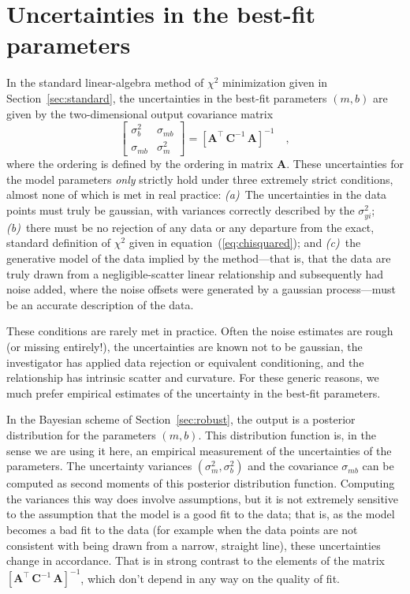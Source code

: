 \documentclass[12pt,twoside]{article}
\newcommand{\sectionname}{Section}
\newcommand{\equationname}{equation}
\newcommand{\mmatrix}[1]{\boldsymbol{#1}}
\newcommand{\inverse}[1]{{#1}^{-1}}
\newcommand{\transpose}[1]{{#1}^{\scriptscriptstyle \top}}
\newcommand{\mA}{\mmatrix{A}}
\newcommand{\mAT}{\transpose{\mA}}
\newcommand{\mC}{\mmatrix{C}}
\newcommand{\mCinv}{\inverse{\mC}}
\begin{document}
\section{Uncertainties in the best-fit parameters}\label{sec:uncertainty}

In the standard linear-algebra method of $\chi^2$ minimization given
in \sectionname~\ref{sec:standard}, the uncertainties in the best-fit
parameters $(m,b)$ are given by the two-dimensional output covariance
matrix
\begin{equation}
\left[\begin{array}{cc}
\sigma_{b}^2 & \sigma_{mb} \\
\sigma_{mb} & \sigma_{m}^2
\end{array}\right] = \inverse{\left[\mAT\,\mCinv\,\mA\right]} \quad ,
\end{equation}
where the ordering is defined by the ordering in matrix $\mA$.  These
uncertainties for the model parameters \emph{only} strictly hold under
three extremely strict conditions, almost none of which is met in real
practice: \textsl{(a)}~The uncertainties in the data points must truly
be gaussian, with variances correctly described by the
$\sigma_{yi}^2$; \textsl{(b)}~there must be no rejection of any data
or any departure from the exact, standard definition of $\chi^2$ given
in \equationname~(\ref{eq:chisquared}); and \textsl{(c)}~the
generative model of the data implied by the method---that is, that the
data are truly drawn from a negligible-scatter linear relationship and
subsequently had noise added, where the noise offsets were generated
by a gaussian process---must be an accurate description of the data.

These conditions are rarely met in practice.  Often the noise
estimates are rough (or missing entirely!), the uncertainties are
known not to be gaussian, the investigator has applied data rejection
or equivalent conditioning, and the relationship has intrinsic scatter
and curvature.  For these generic reasons, we much prefer empirical
estimates of the uncertainty in the best-fit parameters.

In the Bayesian scheme of \sectionname~\ref{sec:robust}, the output is
a posterior distribution for the parameters $(m,b)$.  This
distribution function is, in the sense we are using it here, an
empirical measurement of the uncertainties of the parameters.  The
uncertainty variances $(\sigma_m^2,\sigma_b^2)$ and the covariance
$\sigma_{mb}$ can be computed as second moments of this posterior
distribution function.  Computing the variances this way does involve
assumptions, but it is not extremely sensitive to the assumption that
the model is a good fit to the data; that is, as the model becomes a
bad fit to the data (for example when the data points are not
consistent with being drawn from a narrow, straight line), these
uncertainties change in accordance.  That is in strong contrast to the
elements of the matrix $\inverse{\left[\mAT\,\mCinv\,\mA\right]}$,
which don't depend in any way on the quality of fit.
\end{document}
